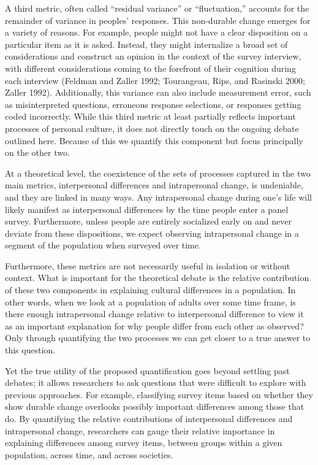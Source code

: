 \documentclass[
  12pt,
]{article}
\begin{document}
A third metric, often called ``residual variance'' or ``fluctuation,''
accounts for the remainder of variance in peoples' responses. This
non-durable change emerges for a variety of reasons. For example, people
might not have a clear disposition on a particular item as it is asked.
Instead, they might internalize a broad set of considerations and
construct an opinion in the context of the survey interview, with
different considerations coming to the forefront of their cognition
during each interview (Feldman and Zaller 1992; Tourangeau, Rips, and
Rasinski 2000; Zaller 1992). Additionally, this variance can also
include measurement error, such as misinterpreted questions, erroneous
response selections, or responses getting coded incorrectly. While this
third metric at least partially reflects important processes of personal
culture, it does not directly touch on the ongoing debate outlined here.
Because of this we quantify this component but focus principally on the
other two.

At a theoretical level, the coexistence of the sets of processes
captured in the two main metrics, interpersonal differences and
intrapersonal change, is undeniable, and they are linked in many ways.
Any intrapersonal change during one's life will likely manifest as
interpersonal differences by the time people enter a panel survey.
Furthermore, unless people are entirely socialized early on and never
deviate from these dispositions, we expect observing intrapersonal
change in a segment of the population when surveyed over time.

Furthermore, these metrics are not necessarily useful in isolation or
without context. What is important for the theoretical debate is the
relative contribution of these two components in explaining cultural
differences in a population. In other words, when we look at a
population of adults over some time frame, is there enough intrapersonal
change relative to interpersonal difference to view it as an important
explanation for why people differ from each other as observed? Only
through quantifying the two processes we can get closer to a true answer
to this question.

Yet the true utility of the proposed quantification goes beyond settling
past debates; it allows researchers to ask questions that were difficult
to explore with previous approaches. For example, classifying survey
items based on whether they show durable change overlooks possibly
important differences among those that do. By quantifying the relative
contributions of interpersonal differences and intrapersonal change,
researchers can gauge their relative importance in explaining
differences among survey items, between groups within a given
population, across time, and across societies.
\end{document}
